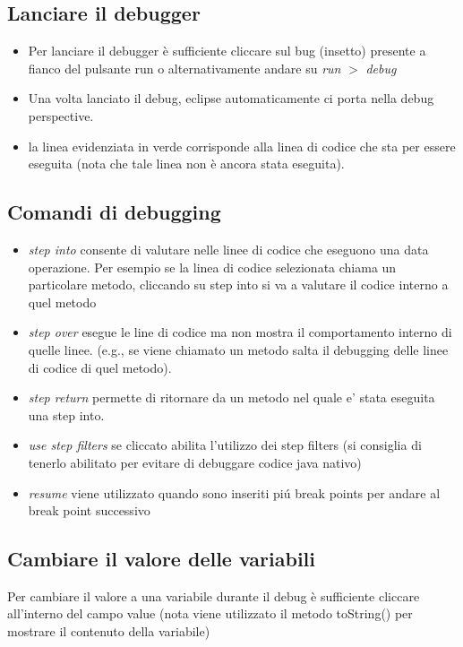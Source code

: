 \documentclass{article}
\begin{document}
\subsection{Lanciare il debugger}
\begin{itemize}
\item Per lanciare il debugger \`e sufficiente cliccare sul bug (insetto) presente a fianco del pulsante run o alternativamente andare su \textit{run} $>$ \textit{debug}
\item Una volta lanciato il debug, eclipse automaticamente ci porta nella debug perspective.
\item la linea evidenziata in verde corrisponde alla linea di codice che sta per essere eseguita (nota che tale linea non \`e ancora stata eseguita).
\end{itemize}

\subsection{Comandi di debugging}

\begin{itemize}
\item \textit{step into} consente di valutare nelle linee di codice che eseguono una data operazione. Per esempio se la linea di codice selezionata chiama un particolare metodo, cliccando su step into si va a valutare il codice interno a quel metodo
\item \textit{step over} esegue le line di codice ma non mostra il comportamento interno di quelle linee. (e.g., se viene chiamato un metodo salta il debugging delle linee di codice di quel metodo).
\item \textit{step return} permette di ritornare da un metodo nel quale e' stata eseguita una step into.
\item \textit{use step filters} se cliccato abilita l'utilizzo dei step filters (si consiglia di tenerlo abilitato per evitare di debuggare codice java nativo)
\item \textit{resume} viene utilizzato quando sono inseriti pi\' u break points per andare al break point successivo
\end{itemize}

\subsection{Cambiare il valore delle variabili}
Per cambiare il valore a una variabile durante il debug \`e sufficiente cliccare all'interno del campo value (nota viene utilizzato il metodo toString() per mostrare il contenuto della variabile)
\end{document}
